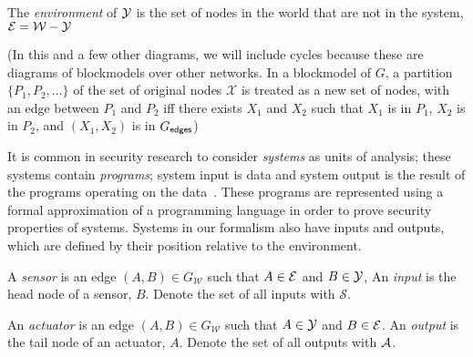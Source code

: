\documentclass[../thesis.tex]{subfiles}
\newcommand{\W}{\mathcal{W}} %
\begin{document}

\begin{dfn}[Environment]
  The \emph{environment} of $\mathcal{Y}$ is the set of 
  nodes in the world that are not in the system,
  $\mathcal{E} = \W - \Y$ 
\end{dfn}
\begin{center}
\end{center}

(In this and a few other diagrams, we will include cycles because
these are diagrams of blockmodels over other networks.
In a blockmodel of $G$, a partition $\{P_1, P_2, \ldots\}$ of the set
of original nodes $\mathcal{X}$ is treated as a new set of nodes,
with an edge between $P_1$ and $P_2$ iff
there exists $X_1$ and $X_2$ such that $X_1$ is in $P_1$, $X_2$ is in $P_2$, and $(X_1,X_2)$ is in $G_{\mathsf{edges}}$)

It is common in security research to consider \emph{systems}
as units of analysis; these systems contain \emph{programs}; system
input is data and system output is the result of the programs
operating on the data~\cite{mclean90sp}.
These programs are represented using a formal approximation of a
programming language
in order to prove security properties of systems.
Systems in our formalism also have inputs and outputs,
which are defined by their position relative
to the environment.

\begin{dfn}
  A \emph{sensor} is an edge $(A,B) \in G_\W$
  such that $A \in \mathcal{E}$ and $B \in \mathcal{Y}$,
  An \emph{input} is the head node of a sensor, $B$.
  Denote the set of all inputs with $\mathcal{S}$.
\end{dfn}

%
%

\begin{dfn}
  An \emph{actuator} is an edge $(A,B) \in G_\W$ such
  that $A \in \mathcal{Y}$ and $B \in \mathcal{E}$.
  An \emph{output} is the tail node of an actuator, $A$.
  Denote the set of all outputs with $\mathcal{A}$.
\end{dfn}
\begin{center}
\end{center}
\end{document}
